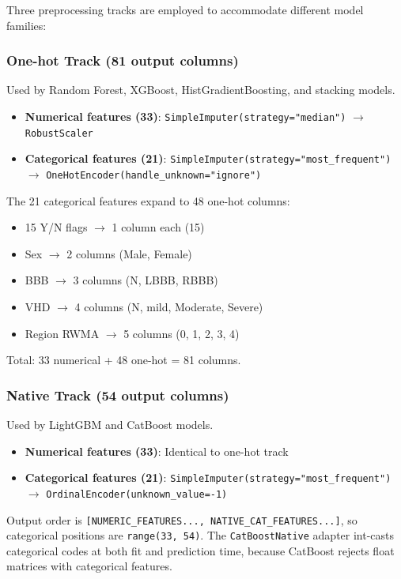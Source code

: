 \documentclass[conference]{IEEEtran}
\begin{document}
Three preprocessing tracks are employed to accommodate different model families:

\subsubsection{One-hot Track (81 output columns)}

Used by Random Forest, XGBoost, HistGradientBoosting, and stacking models.

\begin{itemize}
    \item \textbf{Numerical features (33)}: \texttt{SimpleImputer(strategy="median")} $\rightarrow$ \texttt{RobustScaler}
    \item \textbf{Categorical features (21)}: \texttt{SimpleImputer(strategy="most\_frequent")} $\rightarrow$ \texttt{OneHotEncoder(handle\_unknown="ignore")}
\end{itemize}

The 21 categorical features expand to 48 one-hot columns:
\begin{itemize}
    \item 15 Y/N flags $\rightarrow$ 1 column each (15)
    \item Sex $\rightarrow$ 2 columns (Male, Female)
    \item BBB $\rightarrow$ 3 columns (N, LBBB, RBBB)
    \item VHD $\rightarrow$ 4 columns (N, mild, Moderate, Severe)
    \item Region RWMA $\rightarrow$ 5 columns (0, 1, 2, 3, 4)
\end{itemize}

Total: 33 numerical + 48 one-hot = 81 columns.

\subsubsection{Native Track (54 output columns)}

Used by LightGBM and CatBoost models.

\begin{itemize}
    \item \textbf{Numerical features (33)}: Identical to one-hot track
    \item \textbf{Categorical features (21)}: \texttt{SimpleImputer(strategy="most\_frequent")} $\rightarrow$ \texttt{OrdinalEncoder(unknown\_value=-1)}
\end{itemize}

Output order is \texttt{[NUMERIC\_FEATURES..., NATIVE\_CAT\_FEATURES...]}, so categorical positions are \texttt{range(33, 54)}. The \texttt{CatBoostNative} adapter int-casts categorical codes at both fit and prediction time, because CatBoost rejects float matrices with categorical features.
\end{document}
